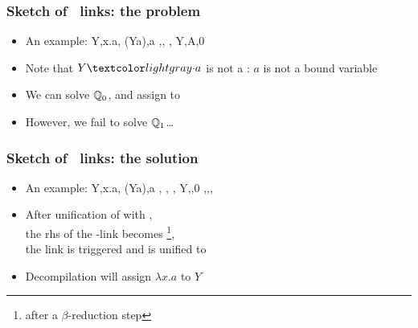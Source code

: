 \documentclass{pres}
\begin{document}
\begin{frame}[fragile]
  \frametitle{Sketch of \maybelam\ links: the problem}

  \def\var{Y}

  \begin{itemize}
    \item An example: 
      \printAlll
      {{{\var,\lambda x.a},
        {(\var\appsep a),a}}}
      {{{,},
        {,}}}
      {{{\var,A,0}}}
      {{}}
    \item Note that $\var\appsep a$ is not a \maybebeta: $a$ is not a bound variable
    \item We can solve $\mathbb{Q}_0$, and assign  to 
    \item However, we fail to solve $\mathbb{Q}_1$\dots
  \end{itemize}

\end{frame}

\begin{frame}[fragile]
  \frametitle{Sketch of \maybelam\ links: the solution}

  \def\var{Y}

  \begin{itemize}
    \item An example: 
      \printAlll
      {{{\var,\lambda x.a},
        {(\var\appsep a),a}}}
      {{{, },
        {,}}}
      {{{\var,,0}}}
      {{{\llambda,,,}}}
    \item After unification of  with , \\
        the rhs of the \llambda-link becomes \footnote{after a $\beta$-reduction step},\\
        the link is triggered and  is unified to 
    \item Decompilation will assign $\lambda x.a$ to $\var$
  \end{itemize}

\end{frame}

\end{document}

